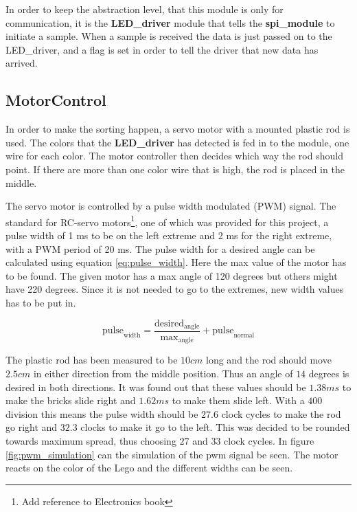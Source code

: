 In order to keep the abstraction level, that this module is only for communication, it is the \textbf{LED\_driver} module that tells the \textbf{spi\_module} to initiate a sample. When a sample is received the data is just passed on to the LED\_driver, and a flag is set in order to tell the driver that new data has arrived.

\subsection{MotorControl}
In order to make the sorting happen, a servo motor with a mounted plastic rod is used. The colors that the \textbf{LED\_driver} has detected is fed in to the module, one wire for each color. The motor controller then decides which way the rod should point. If there are more than one color wire that is high, the rod is placed in the middle. 

The servo motor is controlled by a pulse width modulated (PWM) signal. The standard for RC-servo motors\footnote{Add reference to Electronics book}, one of which was provided for this project, a pulse width of 1 ms to be on the left extreme and 2 ms for the right extreme, with a PWM period of 20 ms. 
The pulse width for a desired angle can be calculated using equation \ref{eq:pulse_width}.
Here the max value of the motor has to be found.
The given motor has a max angle of 120 degrees but others might have 220 degrees.
Since it is not needed to go to the extremes, new width values has to be put in. 

\begin{equation}
 \text{pulse}_\text{width} = \frac{\text{desired}_{\text{angle}}}{\text{max}_{\text{angle}}}+\text{pulse}_{\text{normal}} \label{eq:pulse_width}
\end{equation}

The plastic rod has been measured to be $10 cm$ long and the rod should move $2.5 cm$ in either direction from the middle position.
Thus an angle of $14$ degrees is desired in both directions.
It was found out that these values should be $1.38 ms$ to make the bricks slide right and $1.62 ms$ to make them slide left.
With a $400$ division this means the pulse width should be $27.6$ clock cycles to make the rod go right and $32.3$ clocks to make it go to the left.
This was decided to be rounded towards maximum spread, thus choosing $27$ and $33$ clock cycles.
In figure \ref{fig:pwm_simulation} can the simulation of the pwm signal be seen.
The motor reacts on the color of the Lego and the different widths can be seen.

